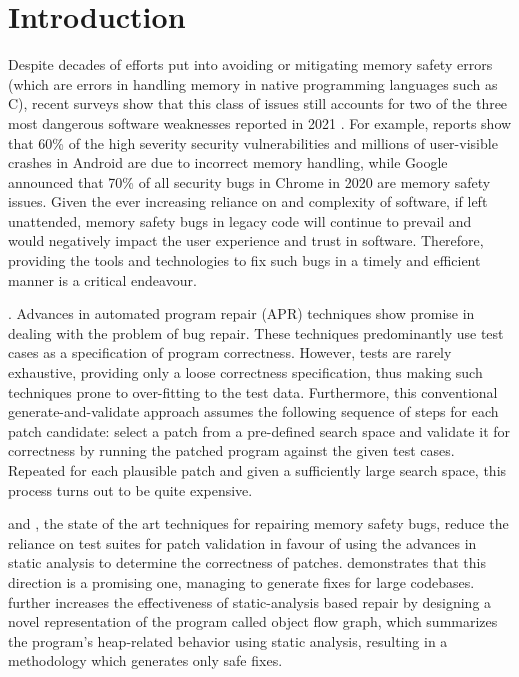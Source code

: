 

\section{Introduction}
\label{sec:intro}

Despite decades of efforts put into avoiding or mitigating memory safety errors (which are errors in handling memory in native programming languages such as C), recent surveys show that this class of issues still accounts for two of the three most dangerous software weaknesses reported in 2021 \cite{cwe-2021}. 
For example, reports show that  60\% of the high severity security vulnerabilities and millions of user-visible crashes in Android are due to incorrect memory handling, while Google announced that 70\% of all security bugs in Chrome in 2020 are memory safety issues.
Given the ever increasing reliance on and complexity of software, if left unattended, memory safety bugs in legacy code will continue to prevail and would negatively impact the user experience and trust in software. Therefore, providing the tools and technologies to fix such bugs in a timely and efficient manner is a critical endeavour.

. 
Advances in automated program repair (APR) techniques \cite{LPR19} show promise
in dealing with the problem of bug repair.
These techniques predominantly use test cases as a specification of program correctness. However, tests are rarely exhaustive, providing only a loose correctness specification, thus making  such techniques  prone to over-fitting to the test data. Furthermore, this conventional generate-and-validate approach assumes the following sequence of steps for each patch candidate: select a patch from a pre-defined search space and validate it for correctness by running the patched program against the given test cases. Repeated for each plausible patch and given a sufficiently large search space, this process turns out to be quite expensive. 

\footpatch \cite{TonderG18} and \saver \cite{HongLLO20}, the state of the art techniques for repairing memory safety bugs, reduce the reliance on test suites for patch validation in favour of using the advances in static analysis to determine the correctness of patches. \footpatch demonstrates that this direction is a promising one, managing to generate fixes for large codebases. \saver further increases the effectiveness of static-analysis based repair by designing a novel representation of the program called object flow graph, which summarizes the program’s
heap-related behavior using static analysis, resulting in a methodology which generates only safe fixes. 

